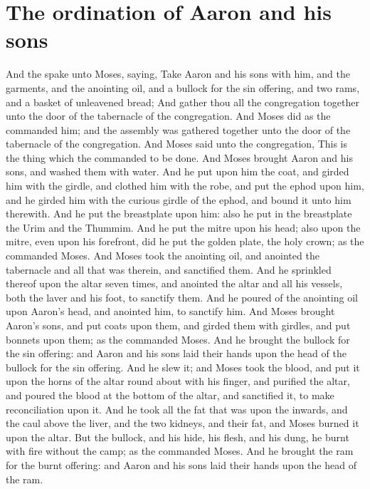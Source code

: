 \section*{The ordination of Aaron and his sons}
\begin{biblechapter} %
\verse And the \LORD spake unto Moses, saying,
\verse Take Aaron and his sons with him, and the garments, and the anointing oil, and a bullock for the sin offering, and two rams, and a basket of unleavened bread;
\verse And gather thou all the congregation together unto the door of the tabernacle of the congregation.
\verse And Moses did as the \LORD commanded him; and the assembly was gathered together unto the door of the tabernacle of the congregation.
\verse And Moses said unto the congregation, This is the thing which the \LORD commanded to be done.
\verse And Moses brought Aaron and his sons, and washed them with water.
\verse And he put upon him the coat, and girded him with the girdle, and clothed him with the robe, and put the ephod upon him, and he girded him with the curious girdle of the ephod, and bound it unto him therewith.
\verse And he put the breastplate upon him: also he put in the breastplate the Urim and the Thummim.
\verse And he put the mitre upon his head; also upon the mitre, even upon his forefront, did he put the golden plate, the holy crown; as the \LORD commanded Moses.
\verse And Moses took the anointing oil, and anointed the tabernacle and all that was therein, and sanctified them.
\verse And he sprinkled thereof upon the altar seven times, and anointed the altar and all his vessels, both the laver and his foot, to sanctify them.
\verse And he poured of the anointing oil upon Aaron's head, and anointed him, to sanctify him.
\verse And Moses brought Aaron's sons, and put coats upon them, and girded them with girdles, and put bonnets upon them; as the \LORD commanded Moses.
\verse And he brought the bullock for the sin offering: and Aaron and his sons laid their hands upon the head of the bullock for the sin offering.
\verse And he slew it; and Moses took the blood, and put it upon the horns of the altar round about with his finger, and purified the altar, and poured the blood at the bottom of the altar, and sanctified it, to make reconciliation upon it.
\verse And he took all the fat that was upon the inwards, and the caul above the liver, and the two kidneys, and their fat, and Moses burned it upon the altar.
\verse But the bullock, and his hide, his flesh, and his dung, he burnt with fire without the camp; as the \LORD commanded Moses.
\verse And he brought the ram for the burnt offering: and Aaron and his sons laid their hands upon the head of the ram.

\end{biblechapter}
